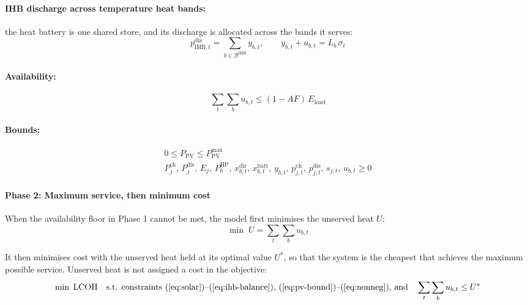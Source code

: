 \documentclass[11pt]{article}
\newcommand{\IHB}{\mathrm{IHB}}
\newcommand{\HP}{\mathrm{HP}}
\newcommand{\PV}{\mathrm{PV}}
\newcommand{\ch}{\mathrm{ch}}
\newcommand{\dis}{\mathrm{dis}}
\newcommand{\Eload}{E_{\mathrm{load}}}
\begin{document}
\paragraph{IHB discharge across temperature heat bands:} the heat battery is one shared store, and its discharge is allocated across the bands it serves:
\begin{equation}
p_{\IHB,t}^{\dis} = \sum_{b \in \mathcal{B}^{\IHB}} y_{b,t}, \qquad y_{b,t} + u_{b,t} = L_{b}\,\sigma_{t}
\label{eq:ihb-balance}
\end{equation}

\paragraph{Availability:}
\begin{equation}
\sum_{t}\sum_{b} u_{b,t} \leq (1 - AF)\,\Eload
\label{eq:availability}
\end{equation}

\paragraph{Bounds:}
\begin{gather}
0 \leq P_{\PV} \leq P_{\PV}^{\max} \label{eq:pv-bound}\\
P_{j}^{\ch},\, P_{j}^{\dis},\, E_{j},\, P_{b}^{\HP},\, x_{b,t}^{\mathrm{dir}},\, x_{b,t}^{\mathrm{batt}},\, y_{b,t},\, p_{j,t}^{\ch},\, p_{j,t}^{\dis},\, s_{j,t},\, u_{b,t} \geq 0 \label{eq:nonneg}
\end{gather}

\paragraph*{Phase 2: Maximum service, then minimum cost}

When the availability floor in Phase 1 cannot be met, the model first minimises the unserved heat $U$:
\begin{equation}
\min\; U = \sum_{t}\sum_{b} u_{b,t}
\label{eq:phase2-U}
\end{equation}

It then minimises cost with the unserved heat held at its optimal value $U^{*}$, so that the system is the cheapest that achieves the maximum possible service. Unserved heat is not assigned a cost in the objective:
\begin{equation}
\min\; \mathrm{LCOH} \quad \text{s.t. constraints (\ref{eq:solar})--(\ref{eq:ihb-balance}), (\ref{eq:pv-bound})--(\ref{eq:nonneg}), and} \quad \sum_{t}\sum_{b} u_{b,t} \leq U^{*}
\label{eq:phase2-Z}
\end{equation}
\end{document}
